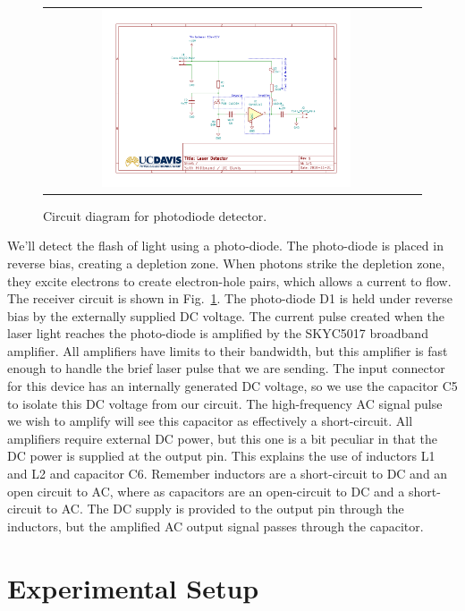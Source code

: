 \begin{figure}[htbp]
\begin{center}
\begin{tabular}{cc}
\includegraphics[width=0.7\textwidth]{figs/labs/c_air/cair_detector}
\end{tabular}
\end{center}
\caption{\label{fig:cdetectorcirc} Circuit diagram for photodiode detector.}
\end{figure}

We'll detect the flash of light using a photo-diode.  The photo-diode
is placed in reverse bias, creating a depletion zone.  When photons
strike the depletion zone, they excite electrons to create
electron-hole pairs, which allows a current to flow.  The receiver
circuit is shown in Fig.~\ref{fig:cdetectorcirc}.  The photo-diode D1
is held under reverse bias by the externally supplied DC voltage.  The
current pulse created when the laser light reaches the photo-diode is
amplified by the SKYC5017 broadband amplifier.  All amplifiers have
limits to their bandwidth, but this amplifier is fast enough to handle
the brief laser pulse that we are sending.  The input connector for
this device has an internally generated DC voltage, so we use the
capacitor C5 to isolate this DC voltage from our circuit.  The
high-frequency AC signal pulse we wish to amplify will see this
capacitor as effectively a short-circuit.  All amplifiers require
external DC power, but this one is a bit peculiar in that the DC power
is supplied at the output pin.  This explains the use of inductors L1
and L2 and capacitor C6.  Remember inductors are a short-circuit to DC
and an open circuit to AC, where as capacitors are an open-circuit to
DC and a short-circuit to AC.  The DC supply is provided to the output
pin through the inductors, but the amplified AC output signal passes
through the capacitor.


\section{Experimental Setup}

